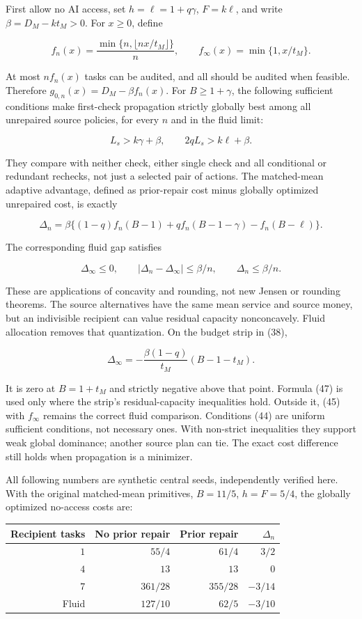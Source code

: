 \documentclass[
  11pt,
  a4paper,
]{article}
\begin{document}
First allow no AI access, set \(h=\ell=1+q\gamma\), \(F=k\ell\), and
write \(\beta=D_M-kt_M>0\). For \(x\geq0\), define

\[f_n(x)=\frac{\min\{n,\lfloor nx/t_M\rfloor\}}{n},
\qquad f_\infty(x)=\min\{1,x/t_M\}. \tag{43}\]

At most \(nf_n(x)\) tasks can be audited, and all should be audited when
feasible. Therefore \(g_{0,n}(x)=D_M-\beta f_n(x)\). For
\(B\geq1+\gamma\), the following sufficient conditions make first-check
propagation strictly globally best among all unrepaired source policies,
for every \(n\) and in the fluid limit:

\[L_s>k\gamma+\beta,\qquad 2qL_s>k\ell+\beta. \tag{44}\]

They compare with neither check, either single check and all conditional
or redundant rechecks, not just a selected pair of actions. The
matched-mean adaptive advantage, defined as prior-repair cost minus
globally optimized unrepaired cost, is exactly

\[\Delta_n=\beta\{(1-q)f_n(B-1)+qf_n(B-1-\gamma)-f_n(B-\ell)\}. \tag{45}\]

The corresponding fluid gap satisfies

\[\Delta_\infty\leq0,\qquad
|\Delta_n-\Delta_\infty|\leq\beta/n,\qquad \Delta_n\leq\beta/n. \tag{46}\]

These are applications of concavity and rounding, not new Jensen or
rounding theorems. The source alternatives have the same mean service
and source money, but an indivisible recipient can value residual
capacity nonconcavely. Fluid allocation removes that quantization. On
the budget strip in (38),

\[\Delta_\infty=-\frac{\beta(1-q)}{t_M}(B-1-t_M). \tag{47}\]

It is zero at \(B=1+t_M\) and strictly negative above that point.
Formula (47) is used only where the strip's residual-capacity
inequalities hold. Outside it, (45) with \(f_\infty\) remains the
correct fluid comparison. Conditions (44) are uniform sufficient
conditions, not necessary ones. With non-strict inequalities they
support weak global dominance; another source plan can tie. The exact
cost difference still holds when propagation is a minimizer.

All following numbers are synthetic central seeds, independently
verified here. With the original matched-mean primitives, \(B=11/5\),
\(h=F=5/4\), the globally optimized no-access costs are:

\begin{longtable}[]{@{}rrrr@{}}
\toprule\noalign{}
Recipient tasks & No prior repair & Prior repair & \(\Delta_n\) \\
\midrule\noalign{}
\endhead
\bottomrule\noalign{}
\endlastfoot
\(1\) & \(55/4\) & \(61/4\) & \(3/2\) \\
\(4\) & \(13\) & \(13\) & \(0\) \\
\(7\) & \(361/28\) & \(355/28\) & \(-3/14\) \\
Fluid & \(127/10\) & \(62/5\) & \(-3/10\) \\
\end{longtable}
\end{document}

